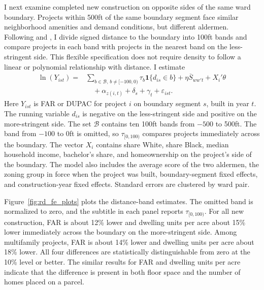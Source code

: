 I next examine completed new construction on opposite sides of the same ward boundary.
Projects within 500ft of the same boundary segment face similar neighborhood amenities and demand conditions, but different aldermen.
Following \citet{bayer_unified_2007} and \citet{kulka_under_2026}, I divide signed distance to the boundary into 100ft bands and compare projects in each band with projects in the nearest band on the less-stringent side.
This flexible specification does not require density to follow a linear or polynomial relationship with distance.
I estimate
%
\begin{equation} \label{eq:segment_fe}
\begin{aligned}
    \ln(Y_{ist}) ={}&
    \sum_{b \in \mathcal{B},\,b \neq [-100,0)}
    \tau_b \mathbf{1}\{d_{is} \in b\}
    + \eta \overline{S}_{ww't}
    + X_i'\theta \\
    &\quad
    + \alpha_{z(i,t)}
    + \delta_s
    + \gamma_t
    + \varepsilon_{ist}.
\end{aligned}
\end{equation}
%
Here $Y_{ist}$ is FAR or DUPAC for project $i$ on boundary segment $s$, built in year $t$.
The running variable $d_{is}$ is negative on the less-stringent side and positive on the more-stringent side.
The set $\mathcal{B}$ contains ten 100ft bands from $-500$ to 500ft.
The band from $-100$ to 0ft is omitted, so $\tau_{[0,100)}$ compares projects immediately across the boundary.
The vector $X_i$ contains share White, share Black, median household income, bachelor's share, and homeownership on the project's side of the boundary.
The model also includes the average score of the two aldermen, the zoning group in force when the project was built, boundary-segment fixed effects, and construction-year fixed effects.
Standard errors are clustered by ward pair.

Figure~\ref{fig:rd_fe_plots} plots the distance-band estimates.
The omitted band is normalized to zero, and the subtitle in each panel reports $\tau_{[0,100)}$.
For all new construction, FAR is about 12\% lower and dwelling units per acre about 15\% lower immediately across the boundary on the more-stringent side.
Among multifamily projects, FAR is about 14\% lower and dwelling units per acre about 18\% lower.
All four differences are statistically distinguishable from zero at the 10\% level or better.
The similar results for FAR and dwelling units per acre indicate that the difference is present in both floor space and the number of homes placed on a parcel.

